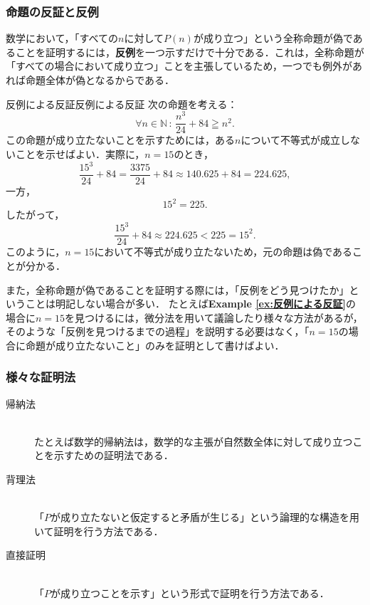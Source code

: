 \documentclass[a4paper,11pt]{ltjsarticle}
\newcommand{\exref}[1]{{\bfseries\sffamily Example \ref{ex:#1}}}
\renewcommand{\geq}{\geqq}
\begin{document}
    \subsubsection{命題の反証と反例}

    数学において，「すべての$n$に対して$P(n)$が成り立つ」という全称命題が偽であることを証明するには，\textbf{反例}を一つ示すだけで十分である．これは，全称命題が「すべての場合において成り立つ」ことを主張しているため，一つでも例外があれば命題全体が偽となるからである．

    \begin{example}{反例による反証}{反例による反証}
        次の命題を考える：
        \[
        \forall n \in \mathbb{N}\, : \, \frac{n^3}{24} + 84 \geq n^2.
        \]
        この命題が成り立たないことを示すためには，ある$n$について不等式が成立しないことを示せばよい．実際に，$n = 15$のとき，
        \[
        \frac{15^3}{24} + 84 = \frac{3375}{24} + 84 \approx 140.625 + 84 = 224.625,
        \]
        一方，
        \[
        15^2 = 225.
        \]
        したがって，
        \[
        \frac{15^3}{24} + 84 \approx 224.625 < 225 = 15^2.
        \]
        このように，$n = 15$において不等式が成り立たないため，元の命題は偽であることが分かる．
    \end{example}

    また，全称命題が偽であることを証明する際には，「反例をどう見つけたか」ということは明記しない場合が多い．
    たとえば\exref{反例による反証}の場合に$n=15$を見つけるには，微分法を用いて議論したり様々な方法があるが，そのような「反例を見つけるまでの過程」を説明する必要はなく，「$n=15$の場合に命題が成り立たないこと」のみを証明として書けばよい．
    
    \subsubsection{様々な証明法}

    \begin{description}
        \item[帰納法] \mbox{} \\
        たとえば数学的帰納法は，数学的な主張が自然数全体に対して成り立つことを示すための証明法である．
        \item[背理法] \mbox{} \\
        「$P$が成り立たないと仮定すると矛盾が生じる」という論理的な構造を用いて証明を行う方法である．
        \item[直接証明] \mbox{} \\
        「$P$が成り立つことを示す」という形式で証明を行う方法である．
    \end{description}
    
\end{document}
